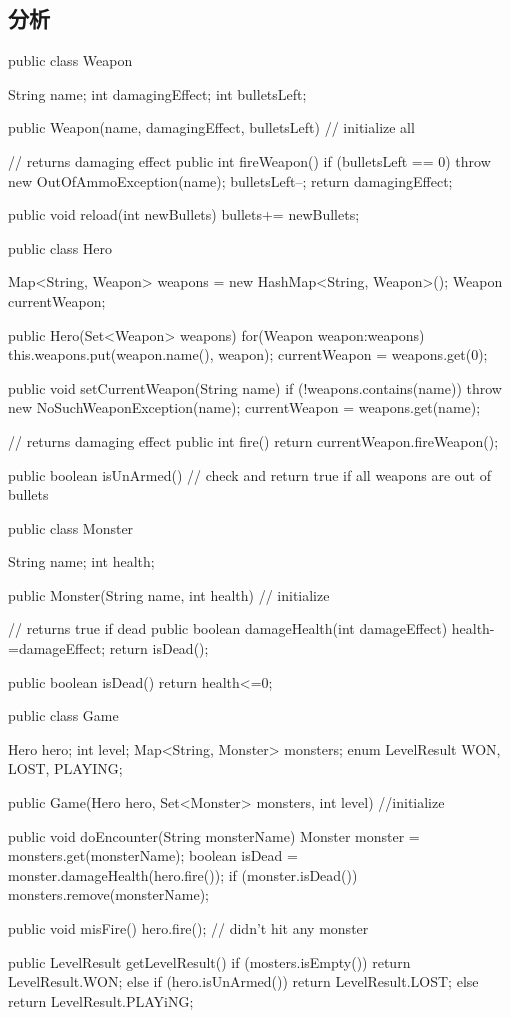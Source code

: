 \subsection{分析}
\begin{Code}
	public class Weapon{
		String name;
		int damagingEffect;
		int bulletsLeft;
		
		public Weapon(name, damagingEffect, bulletsLeft) {// initialize all}
		
		// returns damaging effect
		public int fireWeapon() {
			if (bulletsLeft == 0) {
				throw new OutOfAmmoException(name);
			}
			bulletsLeft--;
			return damagingEffect;
		}
		
		public void reload(int newBullets) {
			bullets+= newBullets;
		}
	}
	
	public class Hero {
		Map<String, Weapon> weapons = new HashMap<String, Weapon>();
		Weapon currentWeapon;
		
		public Hero(Set<Weapon> weapons) {
			for(Weapon weapon:weapons)
			this.weapons.put(weapon.name(), weapon);
			currentWeapon = weapons.get(0);
		}
		
		public void setCurrentWeapon(String name) {
			if (!weapons.contains(name)) {
				throw new NoSuchWeaponException(name);
			}
			currentWeapon = weapons.get(name);
		}
		
		// returns damaging effect
		public int fire() {
			return currentWeapon.fireWeapon();
		}
		
		public boolean isUnArmed() {
			// check and return true if all weapons are out of bullets
		}
	}
	
	public class Monster {
		String name;
		int health;
		
		public Monster(String name, int health) {// initialize}
		
		// returns true if dead
		public boolean damageHealth(int damageEffect) {
			health-=damageEffect;
			return isDead();
		}
		
		public boolean isDead() {
			return health<=0;
		}
	}
	
	public class Game {
		Hero hero;
		int level;
		Map<String, Monster> monsters;
		enum LevelResult {WON, LOST, PLAYING};
		
		public Game(Hero hero, Set<Monster> monsters, int level) {//initialize}
		
		public void doEncounter(String monsterName) {
			Monster monster = monsters.get(monsterName);
			boolean isDead = monster.damageHealth(hero.fire());
			if (monster.isDead()) {
				monsters.remove(monsterName);
			}
		}
		
		public void misFire() {
			hero.fire(); // didn't hit any monster
		}
		
		public LevelResult getLevelResult() {
			if (mosters.isEmpty()) {
				return LevelResult.WON;
			} else if (hero.isUnArmed()) {
			return LevelResult.LOST;
			} else {
				return LevelResult.PLAYiNG;
			}
		}
	}
\end{Code}


